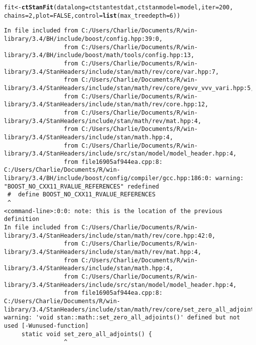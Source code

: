 \documentclass[nojss]{jss}\usepackage[]{graphicx}\usepackage[]{color}
\makeatletter
\newcommand{\hlnum}[1]{\textcolor[rgb]{0.686,0.059,0.569}{#1}}%
\newcommand{\hlstd}[1]{\textcolor[rgb]{0.345,0.345,0.345}{#1}}%
\newcommand{\hlkwb}[1]{\textcolor[rgb]{0.69,0.353,0.396}{#1}}%
\newcommand{\hlkwc}[1]{\textcolor[rgb]{0.333,0.667,0.333}{#1}}%
\newcommand{\hlkwd}[1]{\textcolor[rgb]{0.737,0.353,0.396}{\textbf{#1}}}%
\newenvironment{kframe}{%
 \def\at@end@of@kframe{}%
 \ifinner\ifhmode%
  \def\at@end@of@kframe{\end{minipage}}%
  \begin{minipage}{\columnwidth}%
 \fi\fi%
 \def\FrameCommand##1{\hskip\@totalleftmargin \hskip-\fboxsep
 \colorbox{shadecolor}{##1}\hskip-\fboxsep
     \hskip-\linewidth \hskip-\@totalleftmargin \hskip\columnwidth}%
 \MakeFramed {\advance\hsize-\width
   \@totalleftmargin\z@ \linewidth\hsize
   \@setminipage}}%
 {\par\unskip\endMakeFramed%
 \at@end@of@kframe}
\newenvironment{knitrout}{}{} %
\makeatother
\begin{document}
\begin{knitrout}\small
{}\color{fgcolor}\begin{kframe}
\begin{alltt}
\hlstd{fit}\hlkwb{<-}\hlkwd{ctStanFit}\hlstd{(}\hlkwc{datalong} \hlstd{= ctstantestdat,} \hlkwc{ctstanmodel} \hlstd{= model,} \hlkwc{iter}\hlstd{=}\hlnum{200}\hlstd{,}
  \hlkwc{chains}\hlstd{=}\hlnum{2}\hlstd{,} \hlkwc{plot}\hlstd{=}\hlnum{FALSE}\hlstd{,} \hlkwc{control}\hlstd{=}\hlkwd{list}\hlstd{(}\hlkwc{max_treedepth} \hlstd{=} \hlnum{6}\hlstd{))}
\end{alltt}
\begin{verbatim}
In file included from C:/Users/Charlie/Documents/R/win-library/3.4/BH/include/boost/config.hpp:39:0,
                 from C:/Users/Charlie/Documents/R/win-library/3.4/BH/include/boost/math/tools/config.hpp:13,
                 from C:/Users/Charlie/Documents/R/win-library/3.4/StanHeaders/include/stan/math/rev/core/var.hpp:7,
                 from C:/Users/Charlie/Documents/R/win-library/3.4/StanHeaders/include/stan/math/rev/core/gevv_vvv_vari.hpp:5,
                 from C:/Users/Charlie/Documents/R/win-library/3.4/StanHeaders/include/stan/math/rev/core.hpp:12,
                 from C:/Users/Charlie/Documents/R/win-library/3.4/StanHeaders/include/stan/math/rev/mat.hpp:4,
                 from C:/Users/Charlie/Documents/R/win-library/3.4/StanHeaders/include/stan/math.hpp:4,
                 from C:/Users/Charlie/Documents/R/win-library/3.4/StanHeaders/include/src/stan/model/model_header.hpp:4,
                 from file16905af944ea.cpp:8:
C:/Users/Charlie/Documents/R/win-library/3.4/BH/include/boost/config/compiler/gcc.hpp:186:0: warning: "BOOST_NO_CXX11_RVALUE_REFERENCES" redefined
 #  define BOOST_NO_CXX11_RVALUE_REFERENCES
 ^
<command-line>:0:0: note: this is the location of the previous definition
In file included from C:/Users/Charlie/Documents/R/win-library/3.4/StanHeaders/include/stan/math/rev/core.hpp:42:0,
                 from C:/Users/Charlie/Documents/R/win-library/3.4/StanHeaders/include/stan/math/rev/mat.hpp:4,
                 from C:/Users/Charlie/Documents/R/win-library/3.4/StanHeaders/include/stan/math.hpp:4,
                 from C:/Users/Charlie/Documents/R/win-library/3.4/StanHeaders/include/src/stan/model/model_header.hpp:4,
                 from file16905af944ea.cpp:8:
C:/Users/Charlie/Documents/R/win-library/3.4/StanHeaders/include/stan/math/rev/core/set_zero_all_adjoints.hpp:14:17: warning: 'void stan::math::set_zero_all_adjoints()' defined but not used [-Wunused-function]
     static void set_zero_all_adjoints() {
                 ^
\end{verbatim}
\end{kframe}
\end{knitrout}
\end{document}
